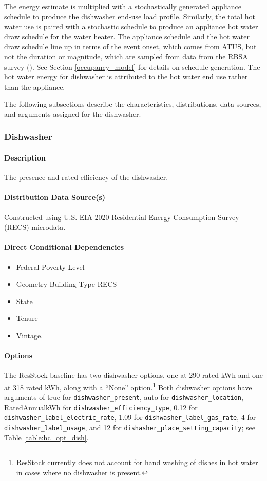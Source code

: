 The energy estimate is multiplied with a stochastically generated appliance schedule to produce the dishwasher end-use load profile. Similarly, the total hot water use is paired with a stochastic schedule to produce an appliance hot water draw schedule for the water heater. The appliance schedule and the hot water draw schedule line up in terms of the event onset, which comes from ATUS, but not the duration or magnitude, which are sampled from data from the RBSA survey (\cite{RBSA}). See Section \ref{occupancy_model} for details on schedule generation. The hot water energy for dishwasher is attributed to the hot water end use rather than the appliance.

The following subsections describe the characteristics, distributions, data sources, and arguments assigned for the dishwasher.

\subsubsection{Dishwasher}
\paragraph{Description}
The presence and rated efficiency of the dishwasher.

\paragraph{Distribution Data Source(s)}
Constructed using U.S. EIA 2020 Residential Energy Consumption Survey (RECS) microdata. 

\paragraph{Direct Conditional Dependencies}
\begin{itemize}
    \item Federal Poverty Level
    \item Geometry Building Type RECS
    \item State
    \item Tenure
    \item Vintage.
\end{itemize}

\paragraph{Options}
The ResStock baseline has two dishwasher options, one at 290 rated kWh and one at 318 rated kWh, along with a ``None'' option.\footnote{ResStock currently does not account for hand washing of dishes in hot water in cases where no dishwasher is present.} Both dishwasher options have arguments of true for \texttt{dishwasher\_present}, auto for \texttt{dishwasher\_location}, RatedAnnualkWh for \texttt{dishwasher\_efficiency\_type}, 0.12 for \texttt{dishwasher\_label\_electric\_rate}, 1.09 for \texttt{dishwasher\_label\_gas\_rate}, 4 for \texttt{dishwasher\_label\_usage}, and 12 for \texttt{dishasher\_place\_setting\_capacity};  see Table \ref{table:hc_opt_dish}. 


